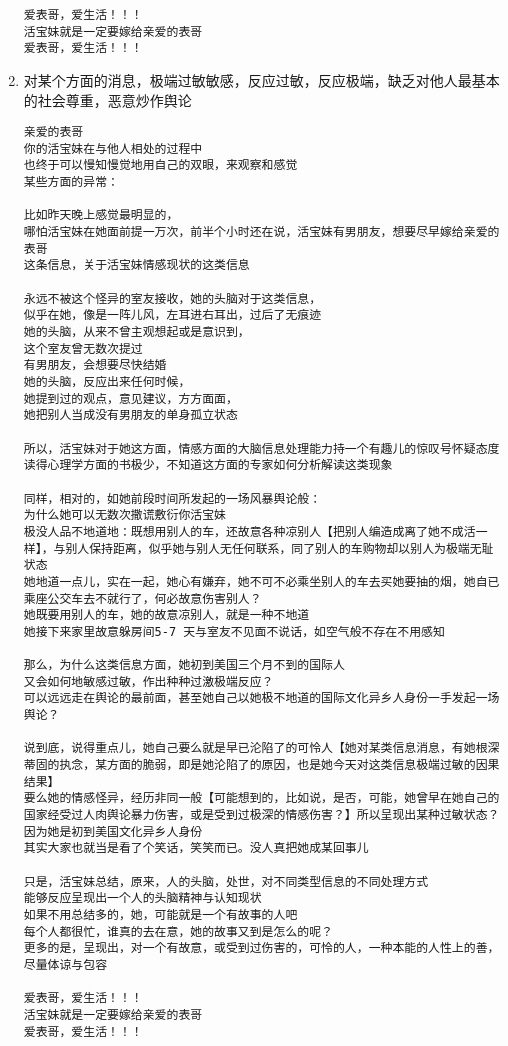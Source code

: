 \documentclass[9pt, b5paper]{article}
\begin{document}
\begin{enumerate}
\begin{verbatim}
爱表哥，爱生活！！！
活宝妹就是一定要嫁给亲爱的表哥
爱表哥，爱生活！！！
\end{verbatim}

\item 对某个方面的消息，极端过敏敏感，反应过敏，反应极端，缺乏对他人最基本的社会尊重，恶意炒作舆论
\label{sec-3-2-3-2}
\begin{verbatim}
亲爱的表哥
你的活宝妹在与他人相处的过程中
也终于可以慢知慢觉地用自己的双眼，来观察和感觉
某些方面的异常：

比如昨天晚上感觉最明显的，
哪怕活宝妹在她面前提一万次，前半个小时还在说，活宝妹有男朋友，想要尽早嫁给亲爱的表哥
这条信息，关于活宝妹情感现状的这类信息

永远不被这个怪异的室友接收，她的头脑对于这类信息，
似乎在她，像是一阵儿风，左耳进右耳出，过后了无痕迹
她的头脑，从来不曾主观想起或是意识到，
这个室友曾无数次提过
有男朋友，会想要尽快结婚
她的头脑，反应出来任何时候，
她提到过的观点，意见建议，方方面面，
她把别人当成没有男朋友的单身孤立状态 

所以，活宝妹对于她这方面，情感方面的大脑信息处理能力持一个有趣儿的惊叹号怀疑态度
读得心理学方面的书极少，不知道这方面的专家如何分析解读这类现象

同样，相对的，如她前段时间所发起的一场风暴舆论般：
为什么她可以无数次撒谎敷衍你活宝妹
极没人品不地道地：既想用别人的车，还故意各种凉别人【把别人编造成离了她不成活一样】，与别人保持距离，似乎她与别人无任何联系，同了别人的车购物却以别人为极端无耻状态
她地道一点儿，实在一起，她心有嫌弃，她不可不必乘坐别人的车去买她要抽的烟，她自已乘座公交车去不就行了，何必故意伤害别人？
她既要用别人的车，她的故意凉别人，就是一种不地道
她接下来家里故意躲房间5-7 天与室友不见面不说话，如空气般不存在不用感知

那么，为什么这类信息方面，她初到美国三个月不到的国际人
又会如何地敏感过敏，作出种种过激极端反应？
可以远远走在舆论的最前面，甚至她自己以她极不地道的国际文化异乡人身份一手发起一场舆论？

说到底，说得重点儿，她自己要么就是早已沦陷了的可怜人【她对某类信息消息，有她根深蒂固的执念，某方面的脆弱，即是她沦陷了的原因，也是她今天对这类信息极端过敏的因果结果】
要么她的情感怪异，经历非同一般【可能想到的，比如说，是否，可能，她曾早在她自己的国家经受过人肉舆论暴力伤害，或是受到过极深的情感伤害？】所以呈现出某种过敏状态？
因为她是初到美国文化异乡人身份
其实大家也就当是看了个笑话，笑笑而已。没人真把她成某回事儿

只是，活宝妹总结，原来，人的头脑，处世，对不同类型信息的不同处理方式
能够反应呈现出一个人的头脑精神与认知现状
如果不用总结多的，她，可能就是一个有故事的人吧
每个人都很忙，谁真的去在意，她的故事又到是怎么的呢？
更多的是，呈现出，对一个有故意，或受到过伤害的，可怜的人，一种本能的人性上的善，尽量体谅与包容

爱表哥，爱生活！！！
活宝妹就是一定要嫁给亲爱的表哥
爱表哥，爱生活！！！
\end{verbatim}
\end{enumerate}
\end{document}
